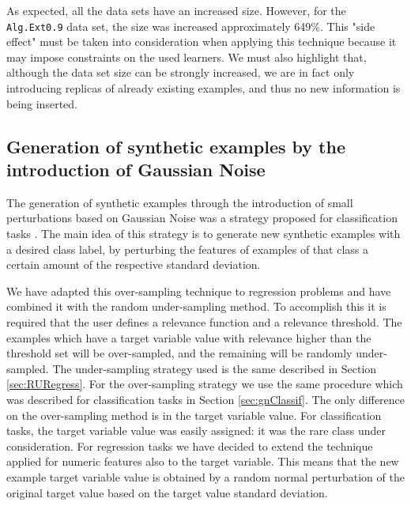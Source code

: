 \documentclass[10pt,a4paper]{article}\usepackage[]{graphicx}\usepackage[]{color}
\begin{document}
As expected, all the data sets have an increased size. However, for the \texttt{Alg.Ext0.9} data set, the size was increased approximately 649\%. This "side effect" must be taken into consideration when applying this technique because it may impose constraints on the used learners. We must also highlight that, although the data set size can be strongly increased, we are in fact only introducing replicas of already existing examples, and thus no new information is being inserted.



\subsection{Generation of synthetic examples by the introduction of Gaussian Noise}\label{sec:gnRegress}

The generation of synthetic examples through the introduction of small perturbations based on Gaussian Noise was a strategy proposed for classification tasks \cite{lee1999regularization, lee2000noisy}. The main idea of this strategy is to generate new synthetic examples with a desired class label, by perturbing the features of examples of that class a certain amount of the respective standard deviation. 

We have adapted this over-sampling technique to regression problems and have combined it with the random under-sampling method. To accomplish this it is required that the user defines a relevance function and a relevance threshold. The examples which have a target variable value with relevance higher than the threshold set will be over-sampled, and the remaining will be randomly under-sampled. The under-sampling strategy used is the same described in Section \ref{sec:RURegress}. For the over-sampling strategy we use the same procedure which was described for classification tasks in Section \ref{sec:gnClassif}. The only difference on the over-sampling method is in the target variable value. For classification tasks, the target variable value was easily assigned: it was the rare class under consideration. For regression tasks we have decided to extend the technique applied for numeric features also to the target variable. This means that the new example target variable value is obtained by a random normal perturbation of the original target value based on the target value standard deviation.
\end{document}
